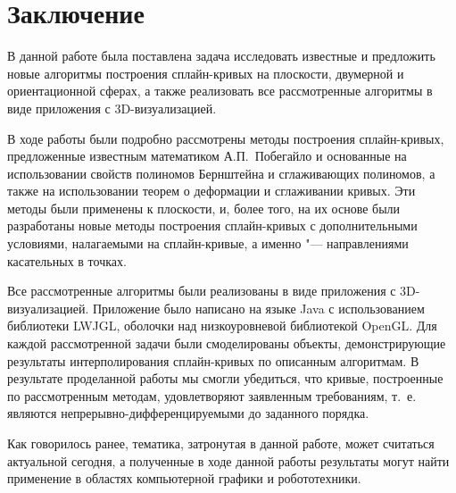 \chapter*{Заключение}

В данной работе была поставлена задача исследовать известные и предложить новые алгоритмы построения сплайн-кривых
на плоскости, двумерной и ориентационной сферах, а также реализовать все рассмотренные алгоритмы в виде приложения
с 3D-визуализацией.

В ходе работы были подробно рассмотрены методы построения сплайн-кри\-вых, предложенные известным математиком
А.П.~Побегайло \cite{pobegaylo} и основанные на использовании свойств полиномов Бернштейна и сглаживающих полиномов,
а также на использовании теорем о деформации и сглаживании кривых. Эти методы были применены к плоскости, и, более того,
на их основе были разработаны новые методы построения сплайн-кривых с дополнительными условиями, налагаемыми на
сплайн-кривые, а именно "--- направлениями касательных в точках.

Все рассмотренные алгоритмы были реализованы в виде приложения с 3D-визуализацией. Приложение было написано на языке
Java с использованием библиотеки LWJGL, оболочки над низкоуровневой библиотекой OpenGL. Для каждой рассмотренной задачи
были смоделированы объекты, демонстрирующие результаты интерполирования сплайн-кривых по описанным алгоритмам.
В результате проделанной работы мы смогли убедиться, что кривые, построенные по рассмотренным методам, удовлетворяют
заявленным требованиям, т.~е. являются непрерывно-дифференцируемыми до заданного порядка.

Как говорилось ранее, тематика, затронутая в данной работе, может считаться актуальной сегодня, а полученные в ходе
данной работы результаты могут найти применение в областях компьютерной графики и робототехники.
